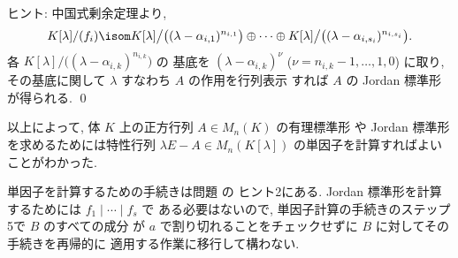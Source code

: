 \documentclass[12pt,twoside]{jarticle}
\begin{document}
\noindent
ヒント: 中国式剰余定理より,
\begin{equation*}
  K[\lambda]/(f_i) 
  \isom 
  K[\lambda]\big/\bigl((\lambda-\alpha_{i,1})^{n_{i,1}}\bigr)
  \oplus\cdots\oplus
  K[\lambda]\big/\bigl((\lambda-\alpha_{i,s_i})^{n_{i,s_i}}\bigr).
\end{equation*}
各 $K[\lambda]\big/\bigl((\lambda-\alpha_{i,k})^{n_{i,k}}\bigr)$ の
基底を $(\lambda-\alpha_{i,k})^\nu$ ($\nu=n_{i,k}-1,\dots,1,0$) 
に取り, その基底に関して $\lambda$ すなわち $A$ の作用を行列表示
すれば $A$ の Jordan 標準形が得られる.
\qed

\bigskip

以上によって, 体 $K$ 上の正方行列 $A\in M_n(K)$ の有理標準形
や Jordan 標準形を求めるためには特性行列 $\lambda E - A\in M_n(K[\lambda])$ 
の単因子を計算すればよいことがわかった.

単因子を計算するための手続きは問題  の
ヒント2にある.  Jordan 標準形を計算するためには $f_1\mid\cdots\mid f_s$ で
ある必要はないので, 単因子計算の手続きのステップ5で $B$ のすべての成分
が $a$ で割り切れることをチェックせずに $B$ に対してその手続きを再帰的に
適用する作業に移行して構わない.
\end{document}

